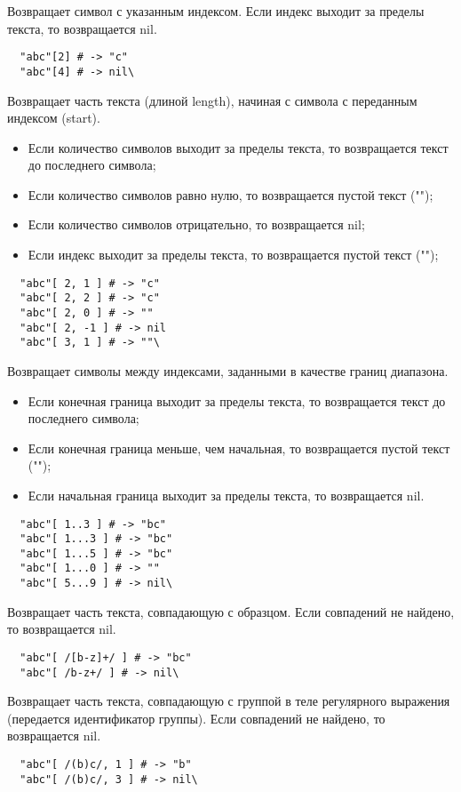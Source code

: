 \begin{methodlist}
  Возвращает символ с указанным индексом. Если индекс выходит за пределы текста, то возвращается nil.
  \begin{verbatim}
  "abc"[2] # -> "c"
  "abc"[4] # -> nil\
  \end{verbatim}

  Возвращает часть текста (длиной length), начиная с символа с переданным индексом (start). 
  \begin{itemize}
    \item Если количество символов выходит за пределы текста, то возвращается текст до последнего символа;
    \item Если количество символов равно нулю, то возвращается пустой текст ("");
    \item Если количество символов отрицательно, то возвращается nil;
    \item Если индекс выходит за пределы текста, то возвращается пустой текст ("");
  \end{itemize}
  \begin{verbatim}
  "abc"[ 2, 1 ] # -> "c"
  "abc"[ 2, 2 ] # -> "c"
  "abc"[ 2, 0 ] # -> ""
  "abc"[ 2, -1 ] # -> nil
  "abc"[ 3, 1 ] # -> ""\
  \end{verbatim}

  Возвращает символы между индексами, заданными в качестве границ диапазона. 
  \begin{itemize}
    \item Если конечная граница выходит за пределы текста, то возвращается текст до последнего символа;

    \item Если конечная граница меньше, чем начальная, то возвращается пустой текст ("");

    \item Если начальная граница выходит за пределы текста, то возвращается nil.
  \end{itemize}
  \begin{verbatim}
  "abc"[ 1..3 ] # -> "bc"
  "abc"[ 1...3 ] # -> "bc"
  "abc"[ 1...5 ] # -> "bc"
  "abc"[ 1...0 ] # -> ""
  "abc"[ 5...9 ] # -> nil\
  \end{verbatim}

  Возвращает часть текста, совпадающую с образцом. Если совпадений не найдено, то возвращается nil.
  \begin{verbatim}
  "abc"[ /[b-z]+/ ] # -> "bc"
  "abc"[ /b-z+/ ] # -> nil\
  \end{verbatim}

  Возвращает часть текста, совпадающую с группой в теле регулярного выражения (передается идентификатор группы). Если совпадений не найдено, то возвращается nil.
  \begin{verbatim}
  "abc"[ /(b)c/, 1 ] # -> "b"
  "abc"[ /(b)c/, 3 ] # -> nil\
  \end{verbatim}
\end{methodlist}

